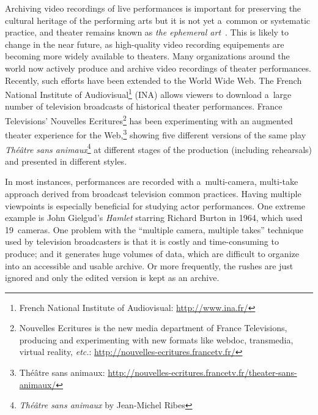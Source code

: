 \documentclass[conference]{IEEEtran}
\begin{document}
Archiving video recordings of live performances is important for preserving the cultural heritage of the performing arts but it is not yet a~common or systematic practice, and theater remains known as {\em the ephemeral art}~\cite{Reason06,Bouchez07}. This is likely to change in the near future, as high-quality video recording equipements are becoming more widely available to theaters.   Many organizations around the world now actively produce and archive video recordings of theater performances. Recently, such efforts have been extended to the World Wide Web. The French National Institute of Audiovisual\footnote{French National Institute of Audiovisual: \url{http://www.ina.fr/}} (INA) allows viewers to download a~large number of   television broadcasts of historical theater performances. France Televisions' Nouvelles Ecritures\footnote{Nouvelles Ecritures is the new media department of France Televisions, producing and experimenting with new formats like webdoc, transmedia, virtual reality, \emph{etc.}: \url{http://nouvelles-ecritures.francetv.fr/}}  has been experimenting with an augmented theater experience for the Web,\footnote{Théâtre sans animaux: \url{http://nouvelles-ecritures.francetv.fr/theater-sans-animaux/}} showing five different versions of the same play \emph{Théâtre sans animaux}\footnote{\emph{Théâtre sans animaux} by Jean-Michel Ribes} at different stages of the production (including rehearsals) and presented in different styles. 


In most instances, performances are recorded with a~multi-camera, multi-take approach derived from broadcast television common practices. Having multiple viewpoints is especially beneficial for studying actor performances.  One extreme example is John Gielgud's  \emph{Hamlet} starring Richard Burton in 1964,  which used 19~cameras.  One problem with the ``multiple camera, multiple takes'' technique used by television broadcasters  is that it is costly and time-consuming to produce; and it generates huge volumes of data, which are  difficult to organize into an accessible and usable archive. Or more frequently, the rushes  are just ignored and only the edited version is kept as an archive. 
\end{document}
